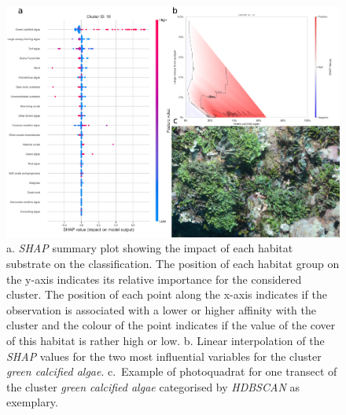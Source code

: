 \begin{figure}
\hypertarget{fig:chap2figS30}{%
\centering
\includegraphics{03-Chapitre2/figures/supplementary/05-explanation_shap_pq_cluster_10.png}
\caption{a. \emph{SHAP} summary plot showing the impact of each habitat
substrate on the classification. The position of each habitat group on
the y-axis indicates its relative importance for the considered cluster.
The position of each point along the x-axis indicates if the observation
is associated with a lower or higher affinity with the cluster and the
colour of the point indicates if the value of the cover of this habitat
is rather high or low. b. Linear interpolation of the \emph{SHAP} values
for the two most influential variables for the cluster \emph{green
calcified algae}. c.~Example of photoquadrat for one transect of the
cluster \emph{green calcified algae} categorised by \emph{HDBSCAN} as
exemplary.}\label{fig:chap2figS30}
}
\end{figure}

